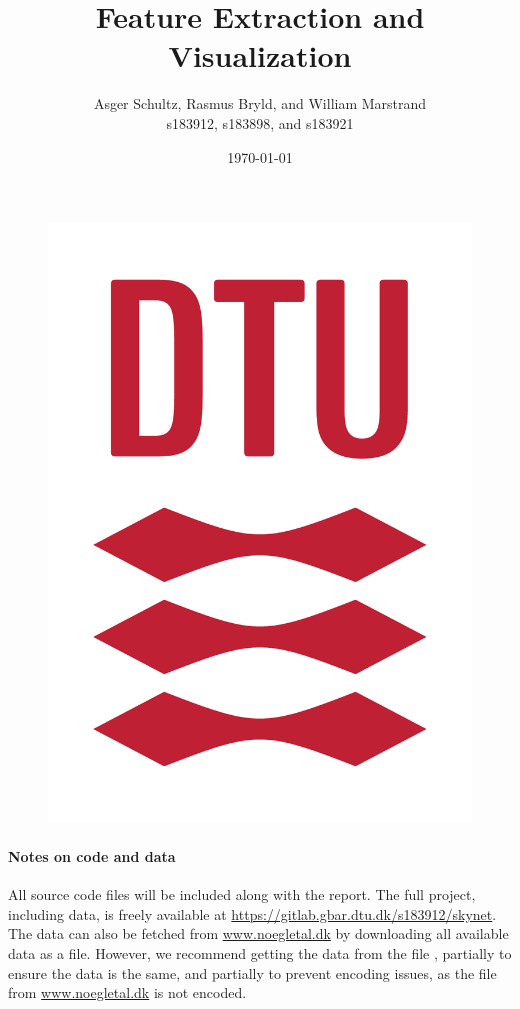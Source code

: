 \documentclass[11pt,fleqn]{article}
\title{Feature Extraction and Visualization}
\author{Asger Schultz, Rasmus Bryld, and William Marstrand\\
	s183912, s183898, and s183921}
\date{\today}
\numberwithin{footnote}{section}
\numberwithin{figure}{section}
\numberwithin{table}{section}
\begin{document}
\maketitle
\begin{figure}[H]
	\centering
	\includegraphics[width=(\textwidth/2)]{DTU_logo}
\end{figure}
\thispagestyle{empty}
\clearpage
\tableofcontents
\vspace{2cm}
\paragraph{Notes on code and data} All source code files will be included along with the report. The full project, including data, is freely available at \url{https://gitlab.gbar.dtu.dk/s183912/skynet}. The data can also be fetched from \url{www.noegletal.dk} by downloading all available data as a  file. However, we recommend getting the data from the file , partially to ensure the data is the same, and partially to prevent encoding issues, as the  file from \url{www.noegletal.dk} is not  encoded.
\end{document}
